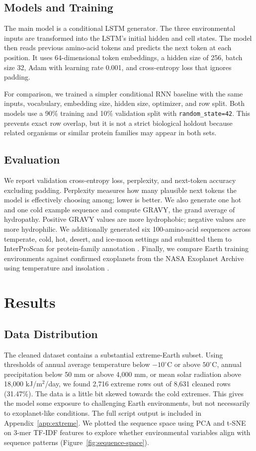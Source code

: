 \documentclass[11pt]{article}
\begin{document}
\subsection{Models and Training}
The main model is a conditional LSTM generator. The three environmental inputs
are transformed into the LSTM's initial hidden and cell states. The model then
reads previous amino-acid tokens and predicts the next token at each position.
It uses 64-dimensional token embeddings, a hidden size of 256, batch size 32,
Adam with learning rate 0.001, and cross-entropy loss that ignores padding.

For comparison, we trained a simpler conditional RNN baseline with the same
inputs, vocabulary, embedding size, hidden size, optimizer, and row split. Both
models use a 90\% training and 10\% validation split with
\texttt{random\_state=42}. This prevents exact row overlap, but it is not a
strict biological holdout because related organisms or similar protein families
may appear in both sets.

\subsection{Evaluation}
We report validation cross-entropy loss, perplexity, and next-token accuracy
excluding padding. Perplexity measures how many plausible next tokens the model
is effectively choosing among; lower is better. We also generate one hot and one
cold example sequence and compute GRAVY, the grand average of hydropathy.
Positive GRAVY values are more hydrophobic; negative values are more
hydrophilic. We additionally generated six 100-amino-acid sequences across
temperate, cold, hot, desert, and ice-moon settings and submitted them to
InterProScan for protein-family annotation \cite{interpro}. Finally, we compare
Earth training environments against confirmed exoplanets from the NASA
Exoplanet Archive using temperature and insolation \cite{nasaexo}.

\section{Results}
\subsection{Data Distribution}
The cleaned dataset contains a substantial extreme-Earth subset. Using thresholds
of annual average temperature below $-10^\circ$C or above $50^\circ$C, annual precipitation below
50 mm or above 4,000 mm, or mean solar radiation above 18,000 kJ/m$^2$/day, we
found 2,716 extreme rows out of 8,631 cleaned rows (31.47\%). The data is a little bit skewed towards the cold extremes. This gives the model some exposure to challenging
Earth environments, but not necessarily to exoplanet-like conditions. The full
script output is included in Appendix~\ref{app:extreme}. We plotted the sequence space using PCA and t-SNE on 3-mer TF-IDF features to explore whether environmental variables align with sequence patterns (Figure~\ref{fig:sequence-space}).
\end{document}
